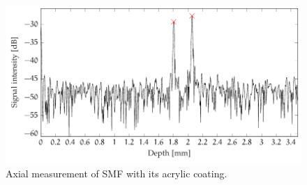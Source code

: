 \begin{figure}[t]
	\myfloatalign
	\includegraphics[width=\linewidth]{gfx/tikz/thickness-measure/fiber-thickness}
	\caption{Axial measurement of \ac{SMF} with its acrylic coating.}\label{fig:fiber-thickness}
\end{figure}


